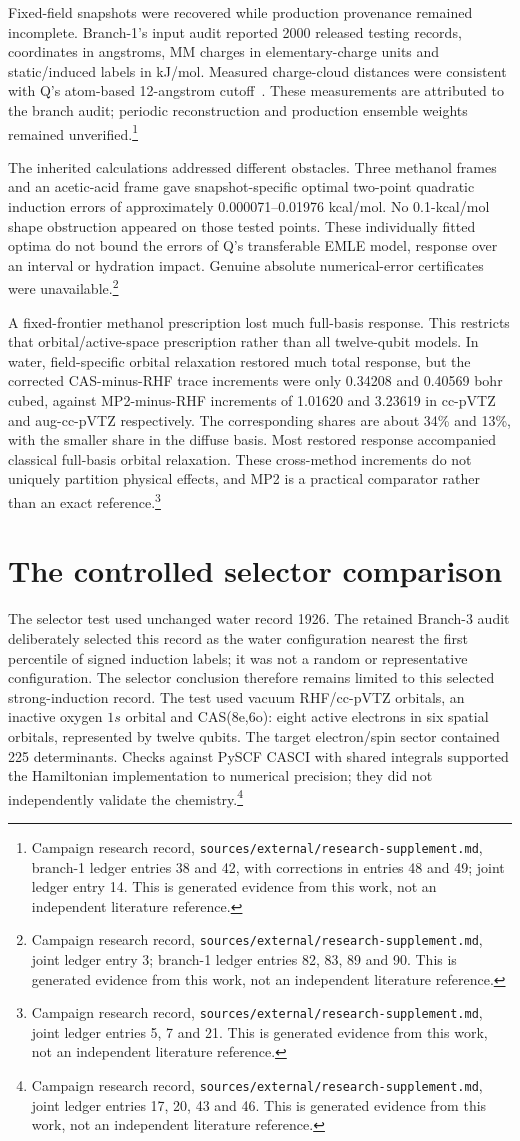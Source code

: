 \documentclass{article}
\newcommand{\record}[1]{\footnote{Campaign research record, \texttt{sources/external/research-supplement.md}, #1. This is generated evidence from this work, not an independent literature reference.}}
\begin{document}
Fixed-field snapshots were recovered while production provenance remained incomplete. Branch-1's input audit reported 2000 released testing records, coordinates in angstroms, MM charges in elementary-charge units and static/induced labels in kJ/mol. Measured charge-cloud distances were consistent with Q's atom-based 12-angstrom cutoff~\cite{Q}. These measurements are attributed to the branch audit; periodic reconstruction and production ensemble weights remained unverified.\record{branch-1 ledger entries 38 and 42, with corrections in entries 48 and 49; joint ledger entry 14}

The inherited calculations addressed different obstacles. Three methanol frames and an acetic-acid frame gave snapshot-specific optimal two-point quadratic induction errors of approximately 0.000071--0.01976 kcal/mol. No 0.1-kcal/mol shape obstruction appeared on those tested points. These individually fitted optima do not bound the errors of Q's transferable EMLE model, response over an interval or hydration impact. Genuine absolute numerical-error certificates were unavailable.\record{joint ledger entry 3; branch-1 ledger entries 82, 83, 89 and 90}

A fixed-frontier methanol prescription lost much full-basis response. This restricts that orbital/active-space prescription rather than all twelve-qubit models. In water, field-specific orbital relaxation restored much total response, but the corrected CAS-minus-RHF trace increments were only 0.34208 and 0.40569 bohr cubed, against MP2-minus-RHF increments of 1.01620 and 3.23619 in cc-pVTZ and aug-cc-pVTZ respectively. The corresponding shares are about 34\% and 13\%, with the smaller share in the diffuse basis. Most restored response accompanied classical full-basis orbital relaxation. These cross-method increments do not uniquely partition physical effects, and MP2 is a practical comparator rather than an exact reference.\record{joint ledger entries 5, 7 and 21}

\section{The controlled selector comparison}
The selector test used unchanged water record 1926. The retained Branch-3 audit deliberately selected this record as the water configuration nearest the first percentile of signed induction labels; it was not a random or representative configuration. The selector conclusion therefore remains limited to this selected strong-induction record. The test used vacuum RHF/cc-pVTZ orbitals, an inactive oxygen \(1s\) orbital and CAS(8e,6o): eight active electrons in six spatial orbitals, represented by twelve qubits. The target electron/spin sector contained 225 determinants. Checks against PySCF CASCI with shared integrals supported the Hamiltonian implementation to numerical precision; they did not independently validate the chemistry.\record{joint ledger entries 17, 20, 43 and 46}
\end{document}
